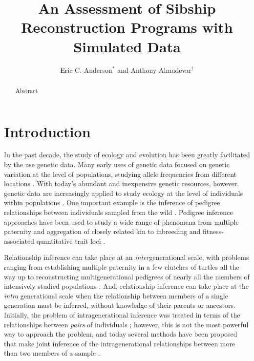 \documentclass[11pt]{article}
\title{An Assessment of Sibship Reconstruction Programs with Simulated Data }
\author{Eric C. Anderson$^*$ and Anthony Almudevar$^\dagger$}
\renewcommand{\baselinestretch}{1.5}
\begin{document}
\renewcommand{\baselinestretch}{1.66}
\normalsize

\maketitle


\begin{abstract}
Abstract
\end{abstract}


\section{Introduction}

In the past decade, the study of ecology and evolution has been greatly facilitated by the use genetic 
data.  Many early uses of genetic data focused on genetic variation at the level of populations, 
studying allele frequencies from different locations \citep{neigel97}. With today's abundant and 
inexpensive genetic resources, however, genetic data are increasingly applied to study ecology at the 
level of individuals within populations \citep{Pea&Cra2004,Maneletal2005}. One important example is the 
inference of pedigree relationships between individuals sampled from the wild 
\citep{blouin03,Pemberton2008}. Pedigree inference approaches have been used to study a wide range of 
phenomena from multiple paternity \citep{Sogardetal2005} and aggregation of closely related kin 
\citep{Fraseretal2005}  to inbreeding \citep{Marshalletal2002} and fitness-associated quantitative 
trait loci \citep{beraldi07}. 

Relationship inference can take place at an {\em inter}generational scale, with problems ranging from 
establishing multiple paternity in a few clutches of turtles \citep{Pea&Avi2001} all the way up to 
reconstructing multigenerational pedigrees of nearly all the members of intensively studied populations 
\citep{Robinsonetal2006,Dunnetal2011}.  And, relationship inference can take place at the {\em intra}
generational scale when the relationship between members of a single generation must be inferred, 
without knowledge of their parents or ancestors.  Initially, the problem of intragenerational inference 
was treated in terms of the relationships between {\em pairs} of individuals \citep{Thompson1975}; 
however, this is not the most powerful way to approach the problem, and today several methods have been 
proposed that make joint inference of the intragenerational relationships between more than two members 
of a sample \citep{painter97,almudevar99,Siebertsetal02,Wang2007_triadic}.  
\end{document}
